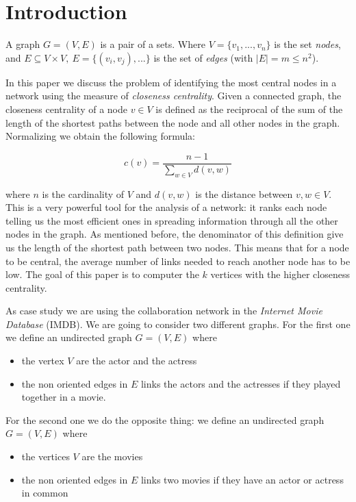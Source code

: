 \section{Introduction}
A graph $G= (V,E)$ is a pair of a sets. Where $V = \{v_1,...,v_n\}$ is the set \emph{nodes}, and $E \subseteq V \times V, ~ E = \{(v_i,v_j),...\}$  is the set of \emph{edges} (with $|E| = m \leq n^2$). \s

In this paper we discuss the problem of identifying the most central nodes in a network using the measure of \emph{closeness centrality}. Given a connected graph, the closeness centrality of a node $v \in V$ is defined as the reciprocal of the sum of the length of the shortest paths between the node and all other nodes in the graph. Normalizing we obtain the following formula:

\begin{equation}\label{closeness}
   c(v) = \frac{n-1}{\displaystyle \sum_{w \in V} d(v,w)}
\end{equation}

where $n$ is the cardinality of $V$ and $d(v,w)$ is the distance between $v,w \in V$. This is a very powerful tool for the analysis of a network: it ranks each node telling us the most efficient ones in spreading information through all the other nodes in the graph. As mentioned before, the denominator of this definition give us the length of the shortest path between two nodes. This means that for a node to be central, the average number of links needed to reach another node has to be low. The goal of this paper is to computer the $k$ vertices with the higher closeness centrality. \s

\noindent As case study we are using the collaboration network in the \emph{Internet Movie Database} (IMDB).  We are going to consider two different graphs. For the first one we define an undirected graph $G=(V,E)$ where
\begin{itemize}
    \item the vertex $V$ are the actor and the actress
    \item the non oriented edges in $E$ links the actors and the actresses if they played together in a movie.
\end{itemize}
For the second one we do the opposite thing: we define an undirected graph $G=(V,E)$ where
\begin{itemize}
    \item the vertices $V$ are the movies
    \item the non oriented edges in $E$ links two movies if they have an actor or actress in common
\end{itemize}


